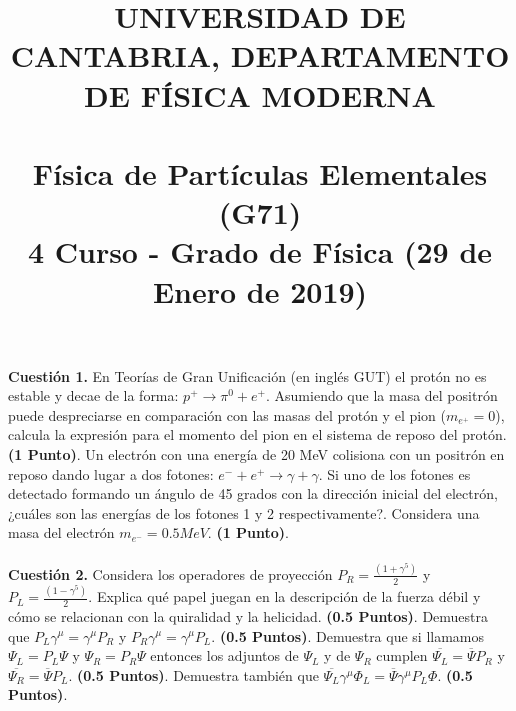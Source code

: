 \documentclass[paper=a4, fontsize=11pt]{scrartcl} %
\date{}
\title{	
\normalfont \normalsize 
\textsc{UNIVERSIDAD DE CANTABRIA, DEPARTAMENTO DE FÍSICA MODERNA} \\ [20pt] %
\horrule{0.5pt} \\[0.4cm] %
\huge Física de Partículas Elementales (G71) \\ %
\normalsize 4 Curso - Grado de Física (29 de Enero de 2019)
\horrule{2pt} \\[0.5cm] %
}
\numberwithin{equation}{section} %
\numberwithin{figure}{section} %
\numberwithin{table}{section} %
\begin{document}
\maketitle %

\vspace{-2.5cm}

\textbf{Cuestión 1.} En Teorías de Gran Unificación (en inglés GUT) el protón no es estable y decae de la forma: $p^{+}\rightarrow\pi^{0} + e^{+}$. Asumiendo que la masa del positrón puede despreciarse
en comparación con las masas del protón y el pion ($m_{e^{+}}=0$), calcula la expresión para el momento del pion en el sistema de reposo del protón. \textbf{(1 Punto)}. Un electrón con una energía de 20 MeV colisiona con un
positrón en reposo dando lugar a dos fotones: $e^{-} + e^{+}\rightarrow\gamma + \gamma$. Si uno de los fotones es detectado formando un ángulo de 45 grados con la dirección inicial del electrón, ¿cuáles son las energías de los fotones 1 y 2 respectivamente?.
Considera una masa del electrón $m_{e^{-}} = 0.5 MeV$. \textbf{(1 Punto)}.
\\
\\
\textbf{Cuestión 2.} Considera los operadores de proyección $P_{R} = \frac{(1+\gamma^5)}{2}$ y $P_{L} = \frac{(1-\gamma^5)}{2}$. Explica qué papel juegan en la descripción de la fuerza débil y cómo se relacionan con la quiralidad y la helicidad. \textbf{(0.5 Puntos)}. Demuestra que
$P_{L}\gamma^{\mu} = \gamma^{\mu}P_{R}$ y $P_{R}\gamma^{\mu} = \gamma^{\mu}P_{L}$. \textbf{(0.5 Puntos)}. Demuestra que si llamamos $\Psi_L = P_L\Psi$ y $\Psi_R = P_R\Psi$ entonces los adjuntos de $\Psi_L$ y de $\Psi_R$ cumplen
$\overline{\Psi_L} = \overline{\Psi}P_R$ y $\overline{\Psi_R} = \overline{\Psi}P_L$. \textbf{(0.5 Puntos)}. Demuestra también que $\overline{\Psi_L}\gamma^{\mu}\Phi_L = \overline{\Psi}\gamma^{\mu}P_L\Phi$. \textbf{(0.5 Puntos)}. 
\\
\\
\end{document}
